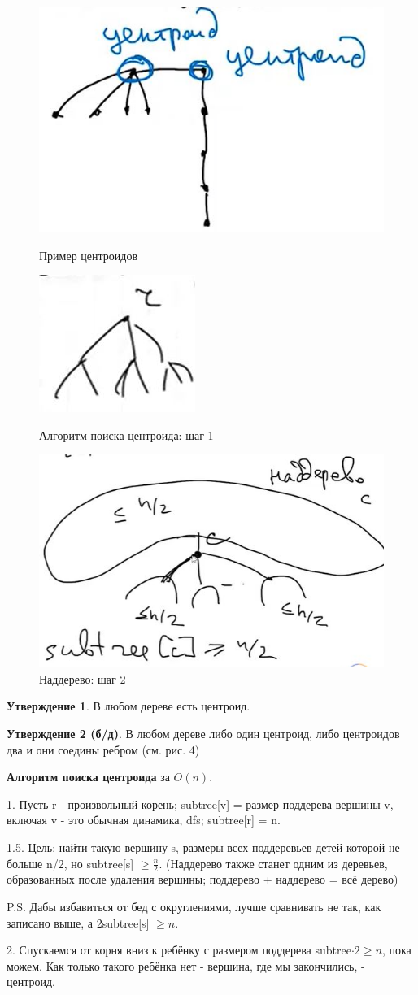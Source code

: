 \begin{figure}[!htb]
   \begin{minipage}{.3301\textwidth}
     \centering
     \includegraphics[height = 2 cm]{images/93-94_centroid}
     \caption{Пример центроидов}
   \end{minipage}\hfill
   \begin{minipage}{.3301\textwidth}
     \centering
     \includegraphics[height = 2 cm]{images/93-94_centroid2}
     \caption{Алгоритм поиска центроида: шаг 1}
   \end{minipage}
    \begin{minipage}{.331\textwidth}
     \centering
     \includegraphics[height = 2 cm]{images/93-94_centroid3}
     \caption{Наддерево: шаг 2}
   \end{minipage}
\end{figure}

\textbf{Утверждение 1}. В любом дереве есть центроид.

\textbf{Утверждение 2 (б/д)}. В любом дереве либо один центроид, либо центроидов два и они соедины ребром (см. рис. 4)

\textbf{Алгоритм поиска центроида} за $O(n)$.

1. Пусть r - произвольный корень; subtree[v] = размер поддерева вершины v, включая v - это обычная динамика, dfs; subtree[r] = n. 

1.5. Цель: найти такую вершину s, размеры всех поддеревьев детей которой не больше n/2, но subtree[s] $\geqslant \frac{n}{2}$. (Наддерево также станет одним из деревьев, образованных после удаления вершины; поддерево + наддерево = всё дерево)

P.S. Дабы избавиться от бед с округлениями, лучше сравнивать не так, как записано выше, а 2subtree[s] $\geqslant n$.

2. Спускаемся от корня вниз к ребёнку с размером поддерева subtree$\cdot 2 \geqslant n$, пока можем. Как только такого ребёнка нет - вершина, где мы закончились, - центроид.
